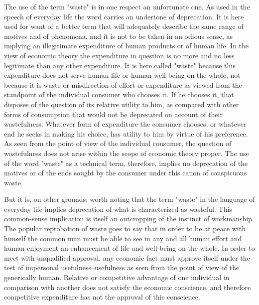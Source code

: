 \documentclass[12pt]{report}
\begin{document}
The use of the term "waste" is in one respect an unfortunate one. As
used in the speech of everyday life the word carries an undertone
of deprecation. It is here used for want of a better term that will
adequately describe the same range of motives and of phenomena, and
it is not to be taken in an odious sense, as implying an illegitimate
expenditure of human products or of human life. In the view of economic
theory the expenditure in question is no more and no less legitimate
than any other expenditure. It is here called "waste" because this
expenditure does not serve human life or human well-being on the whole,
not because it is waste or misdirection of effort or expenditure as
viewed from the standpoint of the individual consumer who chooses it. If
he chooses it, that disposes of the question of its relative utility
to him, as compared with other forms of consumption that would not
be deprecated on account of their wastefulness. Whatever form of
expenditure the consumer chooses, or whatever end he seeks in making his
choice, has utility to him by virtue of his preference. As seen from the
point of view of the individual consumer, the question of wastefulness
does not arise within the scope of economic theory proper. The use of
the word "waste" as a technical term, therefore, implies no deprecation
of the motives or of the ends sought by the consumer under this canon of
conspicuous waste.

But it is, on other grounds, worth noting that the term "waste" in the
language of everyday life implies deprecation of what is characterized
as wasteful. This common-sense implication is itself an outcropping of
the instinct of workmanship. The popular reprobation of waste goes to
say that in order to be at peace with himself the common man must
be able to see in any and all human effort and human enjoyment an
enhancement of life and well-being on the whole. In order to meet with
unqualified approval, any economic fact must approve itself under the
test of impersonal usefulness--usefulness as seen from the point of
view of the generically human. Relative or competitive advantage of
one individual in comparison with another does not satisfy the economic
conscience, and therefore competitive expenditure has not the approval
of this conscience.
\end{document}
